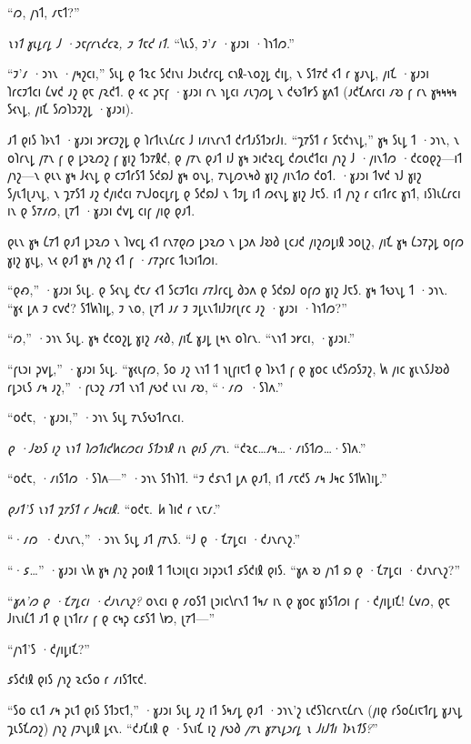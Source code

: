 “𐑼, 𐑢𐑪𐑑, 𐑥𐑱𐑑?”

\emph{𐑯𐑪𐑑 𐑣𐑧𐑛𐑩𐑛 𐑓 ·𐑮𐑱𐑝𐑩𐑯𐑒𐑤𐑷, 𐑲 𐑑𐑱𐑒 𐑦𐑑.} “𐑘𐑧𐑕, 𐑲'𐑥 ·𐑣𐑨𐑮𐑦 ·𐑐𐑪𐑑𐑼.”

“𐑲'𐑥 ·𐑮𐑪𐑯 ·𐑢𐑰𐑟𐑤𐑦,” 𐑕𐑧𐑛 𐑞 𐑑𐑷𐑤 𐑕𐑒𐑦𐑯𐑦 𐑓𐑮𐑧𐑒𐑩𐑤𐑛 𐑤𐑪𐑙-𐑯𐑴𐑟𐑛 𐑒𐑦𐑛, 𐑯 𐑕𐑑𐑳𐑒 𐑬𐑑 𐑩 𐑣𐑨𐑯𐑛, 𐑢𐑦𐑗 ·𐑣𐑨𐑮𐑦 𐑐𐑩𐑤𐑲𐑑𐑤𐑦 𐑖𐑫𐑒 𐑨𐑟 𐑞𐑱 𐑢𐑷𐑒𐑑. 𐑞 𐑬𐑤 𐑜𐑱𐑝 ·𐑣𐑨𐑮𐑦 𐑩𐑯 𐑪𐑛𐑤𐑦 𐑥𐑧𐑠𐑼𐑛 𐑯 𐑒𐑻𐑑𐑾𐑕 𐑣𐑵𐑑 (𐑨𐑒𐑗𐑵𐑩𐑤𐑦 𐑥𐑹 𐑝 𐑩𐑯 𐑣𐑰𐑰𐑰𐑰 𐑕𐑬𐑯𐑛, 𐑢𐑦𐑗 𐑕𐑼𐑐𐑮𐑲𐑟𐑛 ·𐑣𐑨𐑮𐑦).

𐑨𐑑 𐑞𐑦𐑕 𐑐𐑶𐑯𐑑 ·𐑣𐑨𐑮𐑦 𐑮𐑾𐑤𐑲𐑟𐑛 𐑞 𐑐𐑩𐑑𐑧𐑯𐑖𐑩𐑤 𐑓 𐑦𐑥𐑦𐑯𐑩𐑯𐑑 𐑒𐑩𐑑𐑨𐑕𐑑𐑮𐑩𐑓𐑦. “𐑡𐑳𐑕𐑑 𐑩 𐑕𐑱𐑒𐑪𐑯𐑛,” 𐑣𐑰 𐑕𐑧𐑛 𐑑 ·𐑮𐑪𐑯, 𐑯 𐑴𐑐𐑩𐑯𐑛 𐑢𐑳𐑯 𐑝 𐑞 𐑛𐑮𐑷𐑼𐑟 𐑝 𐑣𐑦𐑟 𐑑𐑮𐑳𐑙𐑒, 𐑞 𐑢𐑳𐑯 𐑞𐑨𐑑 𐑦𐑓 𐑣𐑰 𐑮𐑦𐑒𐑷𐑤𐑛 𐑒𐑼𐑧𐑒𐑑𐑤𐑦 𐑢𐑪𐑟 𐑓 ·𐑢𐑦𐑯𐑑𐑼 ·𐑒𐑤𐑴𐑞𐑟—𐑦𐑑 𐑢𐑪𐑟—𐑯 𐑞𐑧𐑯 𐑣𐑰 𐑓𐑬𐑯𐑛 𐑞 𐑤𐑲𐑑𐑩𐑕𐑑 𐑕𐑒𐑸𐑓 𐑣𐑰 𐑴𐑯𐑛, 𐑳𐑯𐑛𐑼𐑯𐑰𐑔 𐑣𐑦𐑟 𐑢𐑦𐑯𐑑𐑼 𐑒𐑴𐑑. ·𐑣𐑨𐑮𐑦 𐑑𐑫𐑒 𐑪𐑓 𐑣𐑦𐑟 𐑕𐑢𐑧𐑑𐑚𐑨𐑯𐑛, 𐑯 𐑡𐑳𐑕𐑑 𐑨𐑟 𐑒𐑢𐑦𐑒𐑤𐑦 𐑳𐑯𐑓𐑴𐑤𐑛𐑩𐑛 𐑞 𐑕𐑒𐑸𐑓 𐑯 𐑑𐑲𐑛 𐑦𐑑 𐑼𐑬𐑯𐑛 𐑣𐑦𐑟 𐑓𐑱𐑕. 𐑦𐑑 𐑢𐑪𐑟 𐑩 𐑤𐑦𐑑𐑩𐑤 𐑣𐑪𐑑, 𐑦𐑕𐑐𐑧𐑖𐑩𐑤𐑦 𐑦𐑯 𐑞 𐑕𐑳𐑥𐑼, 𐑚𐑳𐑑 ·𐑣𐑨𐑮𐑦 𐑒𐑫𐑛 𐑤𐑦𐑝 𐑢𐑦𐑞 𐑞𐑨𐑑.

𐑞𐑧𐑯 𐑣𐑰 𐑖𐑳𐑑 𐑞𐑨𐑑 𐑛𐑮𐑷𐑼 𐑯 𐑐𐑫𐑤𐑛 𐑬𐑑 𐑩𐑯𐑳𐑞𐑼 𐑛𐑮𐑷𐑼 𐑯 𐑛𐑮𐑵 𐑓𐑹𐑔 𐑚𐑤𐑨𐑒 𐑢𐑦𐑟𐑼𐑛𐑦𐑙 𐑮𐑴𐑚𐑟, 𐑢𐑦𐑗 𐑣𐑰 𐑖𐑮𐑳𐑜𐑛 𐑴𐑝𐑼 𐑣𐑦𐑟 𐑣𐑧𐑛, 𐑯𐑬 𐑞𐑨𐑑 𐑣𐑰 𐑢𐑪𐑟 𐑬𐑑 𐑝 ·𐑥𐑳𐑜𐑩𐑤 𐑑𐑧𐑮𐑦𐑑𐑼𐑦.

“𐑞𐑺,” ·𐑣𐑨𐑮𐑦 𐑕𐑧𐑛. 𐑞 𐑕𐑬𐑯𐑛 𐑒𐑱𐑥 𐑬𐑑 𐑕𐑤𐑲𐑑𐑤𐑦 𐑥𐑳𐑓𐑩𐑤𐑛 𐑔𐑮𐑵 𐑞 𐑕𐑒𐑸𐑓 𐑴𐑝𐑼 𐑣𐑦𐑟 𐑓𐑱𐑕. 𐑣𐑰 𐑑𐑻𐑯𐑛 𐑑 ·𐑮𐑪𐑯. “𐑣𐑬 𐑛𐑵 𐑲 𐑤𐑫𐑒? 𐑕𐑑𐑿𐑐𐑦𐑛, 𐑲 𐑯𐑴, 𐑚𐑳𐑑 𐑨𐑥 𐑲 𐑲𐑛𐑧𐑯𐑑𐑦𐑓𐑲𐑩𐑚𐑩𐑤 𐑨𐑟 ·𐑣𐑨𐑮𐑦 ·𐑐𐑪𐑑𐑼?”

“𐑼,” ·𐑮𐑪𐑯 𐑕𐑧𐑛. 𐑣𐑰 𐑒𐑤𐑴𐑟𐑛 𐑣𐑦𐑟 𐑥𐑬𐑔, 𐑢𐑦𐑗 𐑣𐑨𐑛 𐑚𐑰𐑯 𐑴𐑐𐑩𐑯. “𐑯𐑪𐑑 𐑮𐑾𐑤𐑦, ·𐑣𐑨𐑮𐑦.”

“𐑝𐑧𐑮𐑦 𐑜𐑫𐑛,” ·𐑣𐑨𐑮𐑦 𐑕𐑧𐑛. “𐑣𐑬𐑧𐑝𐑼, 𐑕𐑴 𐑨𐑟 𐑯𐑪𐑑 𐑑 𐑪𐑚𐑝𐑦𐑱𐑑 𐑞 𐑐𐑶𐑯𐑑 𐑝 𐑞 𐑣𐑴𐑤 𐑧𐑒𐑕𐑼𐑕𐑲𐑟, 𐑿 𐑢𐑦𐑤 𐑣𐑧𐑯𐑕𐑓𐑹𐑔 𐑩𐑛𐑮𐑧𐑕 𐑥𐑰 𐑨𐑟,” ·𐑝𐑧𐑮𐑟 𐑥𐑲𐑑 𐑯𐑪𐑑 𐑢𐑻𐑒 𐑧𐑯𐑦 𐑥𐑹, “·𐑥𐑼~·𐑕𐑐𐑵.”

“𐑴𐑒𐑱, ·𐑣𐑨𐑮𐑦,” ·𐑮𐑪𐑯 𐑕𐑧𐑛 𐑳𐑯𐑕𐑻𐑑𐑩𐑯𐑤𐑦.

\emph{𐑞 ·𐑓𐑹𐑕 𐑦𐑟 𐑯𐑪𐑑 𐑐𐑼𐑑𐑦𐑒𐑿𐑤𐑼𐑤𐑦 𐑕𐑑𐑮𐑪𐑙 𐑦𐑯 𐑞𐑦𐑕 𐑢𐑳𐑯.} “𐑒𐑷𐑤…𐑥𐑰…·𐑥𐑦𐑕𐑑𐑼…·𐑕𐑐𐑵.”

“𐑴𐑒𐑱, ·𐑥𐑦𐑕𐑑𐑼 ·𐑕𐑐𐑵—” ·𐑮𐑪𐑯 𐑕𐑑𐑪𐑐𐑑. “𐑲 𐑒𐑭𐑯𐑑 𐑛𐑵 𐑞𐑨𐑑, 𐑦𐑑 𐑥𐑱𐑒𐑕 𐑥𐑰 𐑓𐑰𐑤 𐑕𐑑𐑿𐑐𐑦𐑛.”

\emph{𐑞𐑨𐑑'𐑕 𐑯𐑪𐑑 𐑡𐑳𐑕𐑑 𐑩 𐑓𐑰𐑤𐑦𐑙.} “𐑴𐑒𐑱. \emph{𐑿} 𐑐𐑦𐑒 𐑩 𐑯𐑱𐑥.”

“·𐑥𐑼~·𐑒𐑨𐑯𐑩𐑯,” ·𐑮𐑪𐑯 𐑕𐑧𐑛 𐑨𐑑 𐑢𐑳𐑯𐑕. “𐑓 𐑞 ·𐑗𐑳𐑛𐑤𐑦 ·𐑒𐑨𐑯𐑩𐑯𐑟.”

“·𐑭…” ·𐑣𐑨𐑮𐑦 𐑯𐑿 𐑣𐑰 𐑢𐑪𐑟 𐑜𐑴𐑦𐑙 𐑑 𐑑𐑧𐑮𐑦𐑚𐑤𐑦 𐑮𐑦𐑜𐑮𐑧𐑑 𐑭𐑕𐑒𐑦𐑙 𐑞𐑦𐑕. “𐑣𐑵 𐑹 𐑢𐑪𐑑 𐑸 𐑞 ·𐑗𐑳𐑛𐑤𐑦 ·𐑒𐑨𐑯𐑩𐑯𐑟?”

“\emph{𐑣𐑵'𐑼 𐑞 ·𐑗𐑳𐑛𐑤𐑦 ·𐑒𐑨𐑯𐑩𐑯𐑟?} 𐑴𐑯𐑤𐑦 𐑞 𐑥𐑴𐑕𐑑 𐑚𐑮𐑦𐑤𐑘𐑩𐑯𐑑 𐑑𐑰𐑥 𐑦𐑯 𐑞 𐑣𐑴𐑤 𐑣𐑦𐑕𐑑𐑼𐑦 𐑝 ·𐑒𐑢𐑦𐑛𐑦𐑗! 𐑖𐑫𐑼, 𐑞𐑱 𐑓𐑦𐑯𐑦𐑖𐑑 𐑨𐑑 𐑞 𐑚𐑪𐑑𐑩𐑥 𐑝 𐑞 𐑤𐑰𐑜 𐑤𐑭𐑕𐑑 𐑘𐑽, 𐑚𐑳𐑑—”

“𐑢𐑪𐑑'𐑕 ·𐑒𐑢𐑦𐑛𐑦𐑗?”

𐑭𐑕𐑒𐑦𐑙 𐑞𐑦𐑕 𐑢𐑪𐑟 𐑷𐑤𐑕𐑴 𐑩 𐑥𐑦𐑕𐑑𐑱𐑒.

“𐑕𐑴 𐑤𐑧𐑑 𐑥𐑰 𐑜𐑧𐑑 𐑞𐑦𐑕 𐑕𐑑𐑮𐑱𐑑,” ·𐑣𐑨𐑮𐑦 𐑕𐑧𐑛 𐑨𐑟 𐑦𐑑 𐑕𐑰𐑥𐑛 𐑞𐑨𐑑 ·𐑮𐑪𐑯'𐑟 𐑧𐑒𐑕𐑐𐑤𐑩𐑯𐑱𐑖𐑩𐑯 (𐑢𐑦𐑞 𐑩𐑕𐑴𐑖𐑦𐑱𐑑𐑩𐑛 𐑣𐑨𐑯𐑛 𐑡𐑧𐑕𐑗𐑼𐑟) 𐑢𐑪𐑟 𐑢𐑲𐑯𐑛𐑦𐑙 𐑛𐑬𐑯. “𐑒𐑨𐑗𐑦𐑙 𐑞 ·𐑕𐑯𐑦𐑗 𐑦𐑟 𐑢𐑻𐑔 \emph{𐑢𐑳𐑯 𐑣𐑳𐑯𐑛𐑮𐑩𐑛 𐑯 𐑓𐑦𐑓𐑑𐑦 𐑐𐑶𐑯𐑑𐑕?}”

